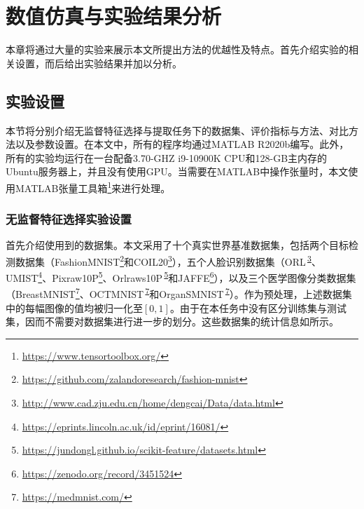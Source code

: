 \chapter{数值仿真与实验结果分析}\label{chap:exp}

本章将通过大量的实验来展示本文所提出方法的优越性及特点。首先介绍实验的相关设置，而后给出实验结果并加以分析。

\section{实验设置}
本节将分别介绍无监督特征选择与提取任务下的数据集、评价指标与方法、对比方法以及参数设置。在本文中，所有的程序均通过MATLAB R2020b编写。此外，所有的实验均运行在一台配备3.70-GHZ i9-10900K CPU和128-GB主内存的Ubuntu服务器上，并且没有使用GPU。当需要在MATLAB中操作张量时，本文使用MATLAB张量工具箱\footnote{\url{https://www.tensortoolbox.org/}}来进行处理。

\subsection{无监督特征选择实验设置}\label{sec:expsetup-ufs}
首先介绍使用到的数据集。本文采用了十个真实世界基准数据集，包括两个目标检测数据集（FashionMNIST\footnote{\url{https://github.com/zalandoresearch/fashion-mnist}}和COIL20\footnote{\label{foot:dengcai}\url{http://www.cad.zju.edu.cn/home/dengcai/Data/data.html}}），五个人脸识别数据集（ORL\,\textsuperscript{\ref{foot:dengcai}}、UMIST\footnote{\label{foot:umist}\url{https://eprints.lincoln.ac.uk/id/eprint/16081/}}、Pixraw10P\footnote{\label{foot:jundongl}\url{https://jundongl.github.io/scikit-feature/datasets.html}}、Orlraws10P\,\textsuperscript{\ref{foot:jundongl}}和JAFFE\footnote{\url{https://zenodo.org/record/3451524}}），以及三个医学图像分类数据集（BreastMNIST\footnote{\label{foot:medmnist}\url{https://medmnist.com/}}、OCTMNIST\,\textsuperscript{\ref{foot:medmnist}}和OrganSMNIST\,\textsuperscript{\ref{foot:medmnist}}）。作为预处理，上述数据集中的每幅图像的值均被归一化至$[0,1]$。由于在本任务中没有区分训练集与测试集，因而不需要对数据集进行进一步的划分。这些数据集的统计信息如所示。

